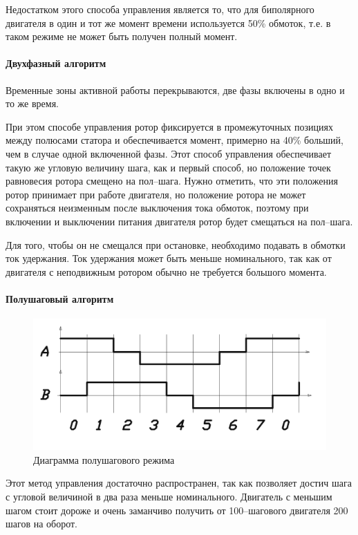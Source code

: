 Недостатком этого способа управления является то, что для биполярного двигателя в
один и тот же момент времени используется 50\% обмоток, т.е. в таком
режиме не может быть получен полный момент.

\paragraph{Двухфазный алгоритм}

Временные зоны активной работы перекрываются, две фазы включены в одно и то же
время.

При этом способе управления ротор фиксируется в промежуточных позициях между
полюсами статора и обеспечивается момент, примерно на 40\% больший, чем в случае
одной включенной фазы. Этот способ управления обеспечивает такую же угловую
величину шага, как и первый способ, но положение точек равновесия ротора смещено
на пол--шага. Нужно отметить, что эти положения ротор принимает при работе двигателя,
но положение ротора не может сохраняться неизменным после выключения тока обмоток,
поэтому при включении и выключении питания двигателя ротор будет смещаться на
пол--шага.

Для того, чтобы он не смещался при остановке, необходимо подавать в обмотки ток
удержания. Ток удержания может быть меньше номинального, так как от двигателя с
неподвижным ротором обычно не требуется большого момента.

\paragraph{Полушаговый алгоритм}

\begin{figure}
    \centering
    \includegraphics[width=0.8\linewidth, keepaspectratio]
                    {./src/pictures/control_algo/half_phase_algo}
    \caption{Диаграмма полушагового режима}
    \label{pic_half_phase_algo}
\end{figure}

Этот метод управления достаточно распространен, так как позволяет достич шага с
угловой величиной в два раза меньше номинального. Двигатель с меньшим шагом стоит
дороже и очень заманчиво получить от 100--шагового двигателя 200 шагов на оборот.

